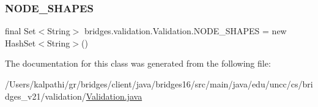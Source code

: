 \subsubsection{\texorpdfstring{N\+O\+D\+E\+\_\+\+S\+H\+A\+P\+ES}{NODE\_SHAPES}}
{\footnotesize\ttfamily final Set$<$String$>$ bridges.\+validation.\+Validation.\+N\+O\+D\+E\+\_\+\+S\+H\+A\+P\+ES = new Hash\+Set$<$String$>$()\hspace{0.3cm}{\ttfamily [static]}}



The documentation for this class was generated from the following file\+:\begin{DoxyCompactItemize}
\item 
/\+Users/kalpathi/gr/bridges/client/java/bridges16/src/main/java/edu/uncc/cs/bridges\+\_\+v21/validation/\hyperlink{_validation_8java}{Validation.\+java}\end{DoxyCompactItemize}
